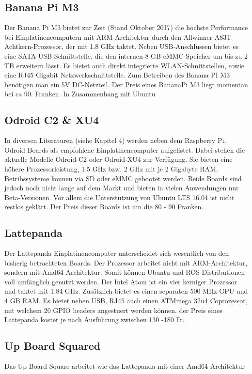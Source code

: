 \subsection{Banana Pi M3}
\label{subsec:BananaPi}
Der Banana Pi M3 bietet zur Zeit (Stand Oktober 2017) die höchste Performance bei Einplatinencomputern mit ARM-Architektur durch den Allwinner A83T Achtkern-Prozessor, der mit 1.8 GHz taktet. Neben USB-Anschlüssen bietet es eine SATA-USB-Schnittstelle, die den internen 8 GB \ac{eMMC}-Speicher um bis zu 2 TB erweitern lässt. Es bietet auch direkt integrierte WLAN-Schnittstellen, sowie eine RJ45 Gigabit Netzwerkschnittstelle. Zum Betreiben des Banana PI M3 benötigen man ein 5V DC-Netzteil. Der Preis eines BananaPi M3 liegt momentan bei ca 90. Franken. In Zusammenhang mit Ubuntu 

 
\subsection{Odroid C2 \& XU4} 
\label{subsec:Odroid}
In diversen Literaturen (siehe \cite{ROSprojects} Kapitel 4) werden neben dem Raspberry Pi, Odroid Boards als empfohlene Einplatinencomputer aufgelistet. Dabei stehen die aktuelle Modelle Odroid-C2 oder Odroid-XU4 zur Verfügung. Sie bieten eine höhere Prozessorleistung, 1.5 GHz bzw. 2 GHz mit je 2 Gigabyte \ac{RAM}. Betribssysteme können via \ac{SD} oder \ac{eMMC} gebootet werden. Beide Boards sind jedoch noch nicht lange auf dem Markt und bieten in vielen Anwendungen nur Beta-Versionen. Vor allem die Unterstützung von Ubuntu LTS 16.04 ist nicht restlos geklärt. Der Preis dieser Boards ist um die 80 - 90 Franken.

\subsection{Lattepanda} 
\label{subsec:Lattepanda}
Der Lattepanda Einplatinencomputer unterscheidet sich wesentlich von den bisherig betrachteten Boards. Der Prozessor arbeitet nicht mit ARM-Architektur, sondern mit Amd64-Architektur. Somit können Ubuntu und ROS Distributionen voll umfänglich genutzt werden. Der Intel Atom ist ein vier kerniger Prozessor und taktet mit 1.84 GHz. Zusätzlich bietet es einen separaten 500 MHz \ac{GPU}  und 4 GB \ac{RAM}. Es bietet neben USB, RJ45 auch einen ATMmega 32u4 Coprozessor, mit welchem 20 GPIO headers angestuert werden können. der Preis eines Lattepanda kostet je nach Ausführung zwischen 130 -180 Fr.

\subsection{Up Board Squared}
\label{subsec:UpBoard}
Das Up Board Square arbeitet wie das Lattepanda mit einer Amd64-Architektur 



